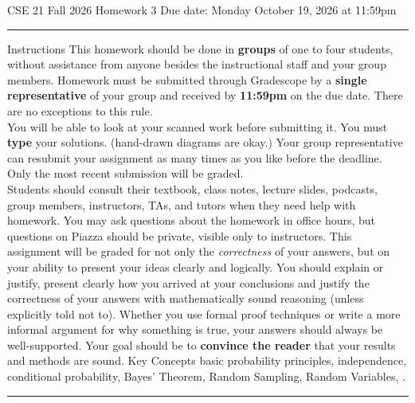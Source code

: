 \documentclass[10pt,letterpaper,unboxed,cm]{article}
\begin{document}
\hfill{CSE 21 Fall 2026}
\hfill{Homework 3}
\hfill{Due date: Monday October 19, 2026 at 11:59pm}
\begin{center}
\begin{minipage}[t]{5.7in}
\rule{\linewidth}{2pt}
{\sc Instructions}\newline
This homework should be done in {\bf groups} of one to four students, without
assistance from anyone besides the instructional staff and your group members.
Homework must be submitted through Gradescope by a {\bf single representative} of
your group and received by {\bf 11:59pm} on the due date. There are no exceptions
to this rule.\\
You will be able to look at your scanned work before submitting it.
You must {\bf type} your solutions. (hand-drawn diagrams are okay.)
Your group representative can resubmit your assignment as many times as you like
before the deadline. Only the most recent submission will be graded.\\
Students should consult their textbook, class notes, lecture slides, podcasts,
group members, instructors, TAs, and tutors when
they need help with homework. You may ask questions about the homework in office
hours, but questions on Piazza should be private, visible only to instructors.
This assignment will be graded for not only the \emph{correctness} of your answers,
but on your ability to present your ideas clearly and logically. You should explain
or justify, present clearly how you arrived at your conclusions and justify the
correctness of your answers with mathematically sound reasoning (unless explicitly
told not to). Whether you use formal proof techniques or write a more informal
argument for why something is true, your answers should always be well-supported.
Your goal should be to {\bf convince the reader} that your results and methods are
sound.
{\sc Key Concepts} basic probability principles,
independence, conditional probability, Bayes’ Theorem, Random Sampling, Random
Variables, .
\rule{\linewidth}{2pt}
\end{minipage} \hfill
\end{center}
\end{document}
